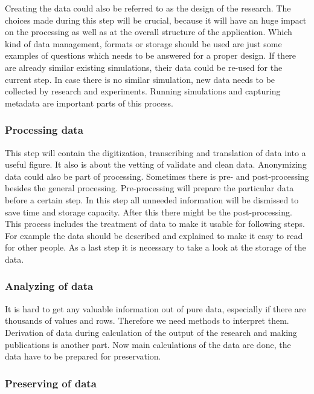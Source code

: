 \documentclass[]{article}
\begin{document}
Creating the data could also be referred to as the design of the
research. The choices made during this step will be crucial, because it
will have an huge impact on the processing as well as at the overall
structure of the application. Which kind of data management, formats or
storage should be used are just some examples of questions which needs
to be answered for a proper design. If there are already similar
existing simulations, their data could be re-used for the current step.
In case there is no similar simulation, new data needs to be collected
by research and experiments. Running simulations and capturing metadata
are important parts of this process.

\subsubsection{Processing data}\label{processing-data}

This step will contain the digitization, transcribing and translation of
data into a useful figure. It also is about the vetting of validate and
clean data. Anonymizing data could also be part of processing. Sometimes
there is pre- and post-processing besides the general processing.
Pre-processing will prepare the particular data before a certain step.
In this step all unneeded information will be dismissed to save time and
storage capacity. After this there might be the post-processing. This
process includes the treatment of data to make it usable for following
steps. For example the data should be described and explained to make it
easy to read for other people. As a last step it is necessary to take a
look at the storage of the data.

\subsubsection{Analyzing of data}\label{analyzing-of-data}

It is hard to get any valuable information out of pure data, especially
if there are thousands of values and rows. Therefore we need methods to
interpret them. Derivation of data during calculation of the output of
the research and making publications is another part. Now main
calculations of the data are done, the data have to be prepared for
preservation.

\subsubsection{Preserving of data}\label{preserving-of-data}
\end{document}
